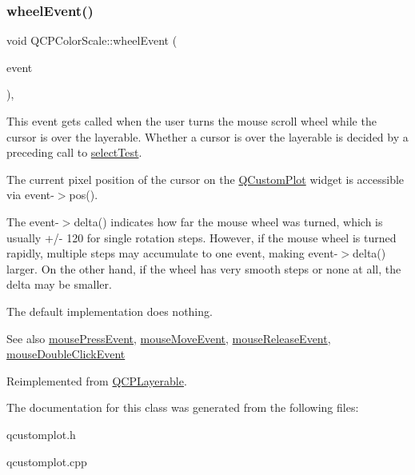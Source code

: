 \mbox{\label{classQCPColorScale_a63cf19be184f6670c9495ad3a9a1baeb}} 
\subsubsection{\texorpdfstring{wheel\+Event()}{wheelEvent()}}
{\footnotesize\ttfamily void Q\+C\+P\+Color\+Scale\+::wheel\+Event (\begin{DoxyParamCaption}\item[{Q\+Wheel\+Event $\ast$}]{event }\end{DoxyParamCaption})\hspace{0.3cm}{\ttfamily [protected]}, {\ttfamily [virtual]}}

This event gets called when the user turns the mouse scroll wheel while the cursor is over the layerable. Whether a cursor is over the layerable is decided by a preceding call to \hyperlink{classQCPLayoutElement_ae97f483cccedadbf18ea4525ef240ee4}{select\+Test}.

The current pixel position of the cursor on the \hyperlink{classQCustomPlot}{Q\+Custom\+Plot} widget is accessible via {\ttfamily event-\/$>$pos()}.

The {\ttfamily event-\/$>$delta()} indicates how far the mouse wheel was turned, which is usually +/-\/ 120 for single rotation steps. However, if the mouse wheel is turned rapidly, multiple steps may accumulate to one event, making {\ttfamily event-\/$>$delta()} larger. On the other hand, if the wheel has very smooth steps or none at all, the delta may be smaller.

The default implementation does nothing.

\begin{DoxySeeAlso}{See also}
\hyperlink{classQCPColorScale_a91f633b97ffcd57fdf8cd814974c20e6}{mouse\+Press\+Event}, \hyperlink{classQCPColorScale_a3b2bd79725aefaf2630fc76e90939442}{mouse\+Move\+Event}, \hyperlink{classQCPColorScale_a6a35dd39ab4e5cb2d7b29ebb4d5b61b0}{mouse\+Release\+Event}, \hyperlink{classQCPLayerable_a4171e2e823aca242dd0279f00ed2de81}{mouse\+Double\+Click\+Event} 
\end{DoxySeeAlso}


Reimplemented from \hyperlink{classQCPLayerable_a47dfd7b8fd99c08ca54e09c362b6f022}{Q\+C\+P\+Layerable}.



The documentation for this class was generated from the following files\+:\begin{DoxyCompactItemize}
\item 
qcustomplot.\+h\item 
qcustomplot.\+cpp\end{DoxyCompactItemize}
